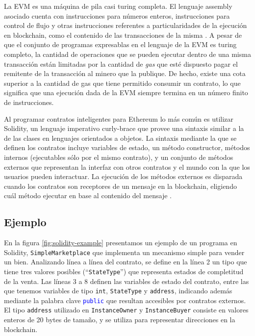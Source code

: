 La EVM es una máquina de pila casi turing completa.
El lenguaje assembly asociado cuenta con instrucciones para números enteros, instrucciones para control de flujo y otras instrucciones referentes a particularidades de la ejecución en blockchain, como el contenido de las transacciones de la misma \cite{evm-opcodes}.
A pesar de que el conjunto de programas expresablas en el lenguaje de la EVM es turing completo, la cantidad de operaciones que se pueden ejecutar dentro de una misma transacción están limitadas por la cantidad de \textit{gas} que esté dispuesto pagar el remitente de la transacción al minero que la publique.
De hecho, existe una cota superior a la cantidad de gas que tiene permitido consumir un contrato, lo que significa que una ejecución dada de la EVM siempre termina en un número finito de instrucciones.

Al programar contratos inteligentes para Ethereum lo más común es utilizar Solidity, un lenguaje imperativo curly-brace que provee una sintaxis similar a la de las clases en lenguajes orientados a objetos.
La sintaxis mediante la que se definen los contratos incluye variables de estado, un método constructor, métodos internos (ejecutables sólo por el mismo contrato), y  un conjunto de métodos externos que representan la interfaz con otros contratos y el mundo con la que los usuarios pueden interactuar.
La ejecución de los métodos externos es disparada cuando los contratos son receptores de un mensaje en la blockchain, eligiendo cuál método ejecutar en base al contenido del mensaje \cite{??}. %

\subsection{Ejemplo}
En la figura \ref{fig:solidity-example} presentamos un ejemplo de un programa en Solidity, \texttt{SimpleMarketplace} que implementa un mecanismo simple para vender un bien.
Analizando línea a línea del contrato, se define en la línea 2 un tipo que tiene tres valores posibles (``\texttt{StateType}'') que representa estados de completitud de la venta.
Las líneas 3 a 8 definen las variables de estado del contrato, entre las que tenemos variables de tipo \texttt{int}, \texttt{StateType} y \texttt{address}, indicando además mediante la palabra clave \textcolor{blue}{\texttt{public}} que resultan accesibles por contratos externos.
El tipo \texttt{address} utilizado en \texttt{InstanceOwner} y \texttt{InstanceBuyer} consiste en valores enteros de 20 bytes de tamaño, y se utiliza para representar direcciones en la blockchain.

